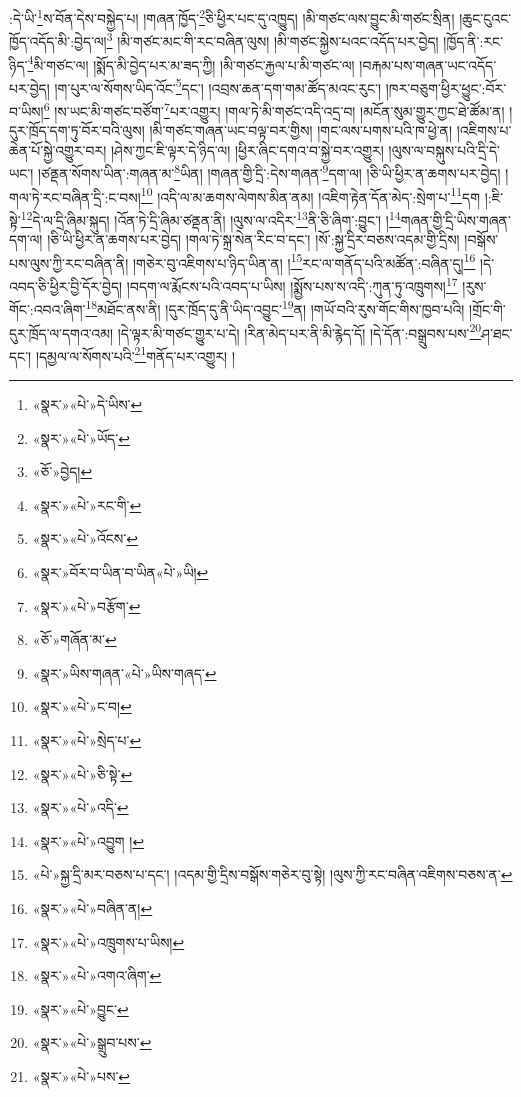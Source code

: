 :དེ་ཡི་\footnote{«སྣར་»«པེ་»དེ་ཡིས་}ས་བོན་དེས་བསྐྱེད་པ། །གཞན་ཁྱོད་\footnote{«སྣར་»«པེ་»ཡོད་}ཅི་ཕྱིར་པང་དུ་འཁྱུད། །མི་གཙང་ལས་བྱུང་མི་གཙང་སྲིན། །ཆུང་ངུའང་ཁྱོད་འདོད་མི་:བྱེད་ལ།\footnote{«ཅོ་»བྱེད།} །མི་གཙང་མང་གི་རང་བཞིན་ལུས། །མི་གཙང་སྐྱེས་པའང་འདོད་པར་བྱེད། །ཁྱོད་ནི་:རང་ཉིད་\footnote{«སྣར་»«པེ་»རང་གི་}མི་གཙང་ལ། །སྨོད་མི་བྱེད་པར་མ་ཟད་ཀྱི། །མི་གཙང་རྐྱལ་པ་མི་གཙང་ལ། །བརྐམ་པས་གཞན་ཡང་འདོད་པར་བྱེད། །ག་པུར་ལ་སོགས་ཡིད་འོང་\footnote{«སྣར་»«པེ་»འོངས་}དང་། །འབྲས་ཆན་དག་གམ་ཚོད་མའང་རུང་། །ཁར་བཅུག་ཕྱིར་ཕྱུང་:བོར་བ་ཡིས།\footnote{«སྣར་»བོར་བ་ཡིན་བ་ཡིན«པེ་»ཡི།} །ས་ཡང་མི་གཙང་བཙོག་\footnote{«སྣར་»«པེ་»བརྩོག་}པར་འགྱུར། །གལ་ཏེ་མི་གཙང་འདི་འདྲ་བ། །མངོན་སུམ་གྱུར་ཀྱང་ཐེ་ཚོམ་ན། །དུར་ཁྲོད་དག་ཏུ་བོར་བའི་ལུས། །མི་གཙང་གཞན་ཡང་བལྟ་བར་གྱིས། །གང་ལས་པགས་པའི་ཁ་ཕྱེ་ན། །འཇིགས་པ་ཆེན་པོ་སྐྱེ་འགྱུར་བར། །ཤེས་ཀྱང་ཇི་ལྟར་དེ་ཉིད་ལ། །ཕྱིར་ཞིང་དགའ་བ་སྐྱེ་བར་འགྱུར། །ལུས་ལ་བསྐུས་པའི་དྲི་དེ་ཡང་། །ཙནྡན་སོགས་ཡིན་:གཞན་མ་\footnote{«ཅོ་»གཞོན་མ་}ཡིན། །གཞན་གྱི་དྲི་:དེས་གཞན་\footnote{«སྣར་»ཡིས་གཞན་«པེ་»ཡིས་གཞད་}དག་ལ། །ཅི་ཡི་ཕྱིར་ན་ཆགས་པར་བྱེད། །གལ་ཏེ་རང་བཞིན་དྲི་:ང་བས།\footnote{«སྣར་»«པེ་»ང་བ།} །འདི་ལ་མ་ཆགས་ལེགས་མིན་ནམ། །འཇིག་རྟེན་དོན་མེད་:སྲེག་པ་\footnote{«སྣར་»«པེ་»སྲེད་པ་}དག །:ཇི་སྟེ་\footnote{«སྣར་»«པེ་»ཅི་སྟེ་}དེ་ལ་དྲི་ཞིམ་སྐུད། །འོན་ཏེ་དྲི་ཞིམ་ཙནྡན་ནི། །ལུས་ལ་འདིར་\footnote{«སྣར་»«པེ་»འདི་}ནི་ཅི་ཞིག་:བྱུང་། །\footnote{«སྣར་»«པེ་»འབྱུག །}གཞན་གྱི་དྲི་ཡིས་གཞན་དག་ལ། །ཅི་ཡི་ཕྱིར་ན་ཆགས་པར་བྱེད། །གལ་ཏེ་སྐྲ་སེན་རིང་བ་དང་། །སོ་:སྐྱ་དྲིར་བཅས་འདམ་གྱི་དྲིས། །བསྒོས་པས་ལུས་ཀྱི་རང་བཞིན་ནི། །གཅེར་བུ་འཇིགས་པ་ཉིད་ཡིན་ན། །\footnote{«པེ་»སྐྱ་དྲི་མར་བཅས་པ་དང་། །འདམ་གྱི་དྲིས་བསྒོས་གཅེར་བུ་སྟེ། །ལུས་ཀྱི་རང་བཞིན་འཇིགས་བཅས་ན་}རང་ལ་གནོད་པའི་མཚོན་:བཞིན་དུ།\footnote{«སྣར་»«པེ་»བཞིན་ན།} །དེ་འབད་ཅི་ཕྱིར་བྱི་དོར་བྱེད། །བདག་ལ་རྨོངས་པའི་འབད་པ་ཡིས། །སྨྱོས་པས་ས་འདི་:ཀུན་ཏུ་འཁྲུགས།\footnote{«སྣར་»«པེ་»འཁྲུགས་པ་ཡིས།} །རུས་གོང་:འབའ་ཞིག་\footnote{«སྣར་»«པེ་»འགའ་ཞིག་}མཐོང་ནས་ནི། །དུར་ཁྲོད་དུ་ནི་ཡིད་འབྱུང་\footnote{«སྣར་»«པེ་»བྱུང་}ན། །གཡོ་བའི་རུས་གོང་གིས་ཁྱབ་པའི། །གྲོང་གི་དུར་ཁྲོད་ལ་དགའ་འམ། །དེ་ལྟར་མི་གཙང་གྱུར་པ་དེ། །རིན་མེད་པར་ནི་མི་རྙེད་དོ། །དེ་དོན་:བསྒྲུབས་པས་\footnote{«སྣར་»«པེ་»སྒྲུབ་པས་}ཤ་ཐང་དང་། །དམྱལ་ལ་སོགས་པའི་\footnote{«སྣར་»«པེ་»པས་}གནོད་པར་འགྱུར། །
